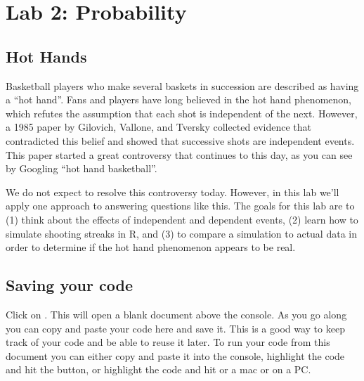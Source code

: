 \documentclass{article}\usepackage[]{graphicx}\usepackage[]{color}
\begin{document}

\section*{Lab 2: Probability}

\subsection*{Hot Hands}
Basketball players who make several baskets in succession are described as having a ``hot hand''. Fans and players have long believed in the hot hand phenomenon, which refutes the assumption that each shot is independent of the next. However, a 1985 paper by Gilovich, Vallone, and Tversky collected evidence that contradicted this belief and showed that successive shots are independent events. This paper started a great controversy that continues to this day, as you can see by Googling ``hot hand basketball''.

We do not expect to resolve this controversy today. However, in this lab we'll apply one approach to answering questions like this. The goals for this lab are to (1) think about the effects of independent and dependent events, (2) learn how to simulate shooting streaks in R, and (3) to compare a simulation to actual data in order to determine if the hot hand phenomenon appears to be real.

%

\subsection*{Saving your code}
Click on . This will open a blank document above the console. As you go along you can copy and paste your code here and save it. This is a good way to keep track of your code and be able to reuse it later. To run your code from this document you can either copy and paste it into the console, highlight the code and hit the  button, or highlight the code and hit  or a mac or  on a PC.
\end{document}
